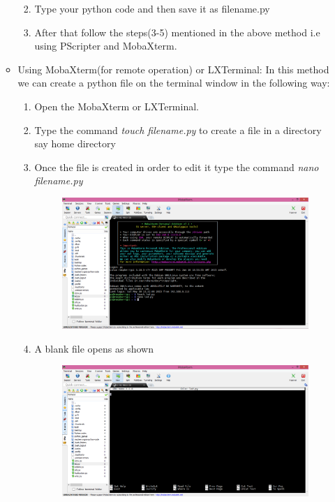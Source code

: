 \documentclass[11pt,a4paper]{article}
\begin{document}
\begin{enumerate}
\begin{itemize}
\begin{enumerate}
\begin{figure}[h!]
					\centering
				\end{figure}
				\item Type your python code and then save it as filename.py 
				\item After that follow the steps(3-5) mentioned in the above method i.e using PScripter and MobaXterm.
			\end{enumerate}
			\item Using MobaXterm(for remote operation) or LXTerminal:
			In this method we can create a python file on the terminal window in the following way:
			\begin{enumerate}
				\item Open the MobaXterm or LXTerminal.
				\item Type the command \textit{touch filename.py} to create a file in a directory say home directory
				\item Once the file is created in order to edit it type the command \textit{nano filename.py}
				\newpage
				\begin{figure}[h!]
					\includegraphics[scale=0.4]{4.png}
					\centering
				\end{figure}
				\item A blank file opens as shown 
				\begin{figure}[h!]
					\includegraphics[scale=0.4]{5.png}

\end{figure}
\end{enumerate}
\end{itemize}
\end{enumerate}
\end{document}
